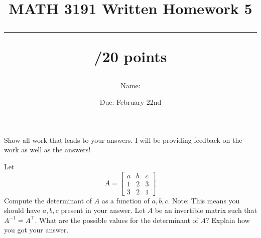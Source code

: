 \documentclass{exam}
\title{MATH 3191 Written Homework 5\\\rule{30pt}{1pt}/20 points}
\author{Name: \rule{150pt}{1pt}}
\date{Due: February 22nd}
\begin{document}
\maketitle
Show all work that leads to your answers. I will be providing feedback on the work as well as the answers!
\begin{questions}
    \question[10] Let
    \[
        A = \begin{bmatrix}
            a & b & c\\
            1 & 2 & 3\\
            3 & 2 & 1
        \end{bmatrix}
    \]
    Compute the determinant of $A$ as a function of $a,b,c$. Note: This means you should have
    $a,b,c$ present in your answer.
    \newpage
    \question[10] Let $A$ be an invertible matrix such that $A^{-1} = A^\top$. What are the possible
    values for the determinant of $A$? Explain how you got your answer.
\end{questions}
\end{document}
